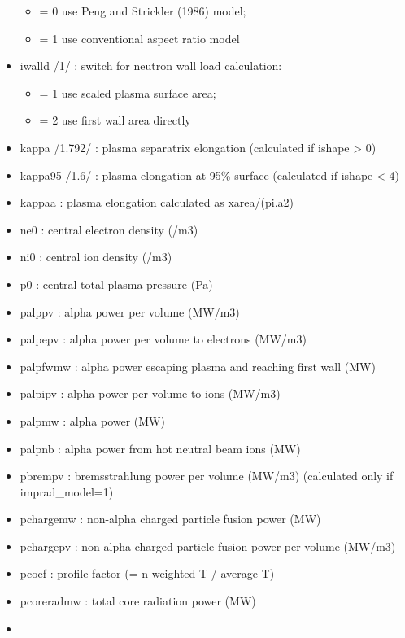 \documentclass[]{article}
\begin{document}
\begin{itemize}
  \begin{itemize}
  \itemsep1pt\parskip0pt
  \item
    = 0 use Peng and Strickler (1986) model;
  \item
    = 1 use conventional aspect ratio model
  \end{itemize}
\item
  iwalld /1/ : switch for neutron wall load calculation:

  \begin{itemize}
  \itemsep1pt\parskip0pt
  \item
    = 1 use scaled plasma surface area;
  \item
    = 2 use first wall area directly
  \end{itemize}
\item
  kappa /1.792/ : plasma separatrix elongation (calculated if ishape
  \textgreater{} 0)
\item
  kappa95 /1.6/ : plasma elongation at 95\% surface (calculated if
  ishape \textless{} 4)
\item
  kappaa : plasma elongation calculated as xarea/(pi.a2)
\item
  ne0 : central electron density (/m3)
\item
  ni0 : central ion density (/m3)
\item
  p0 : central total plasma pressure (Pa)
\item
  palppv : alpha power per volume (MW/m3)
\item
  palpepv : alpha power per volume to electrons (MW/m3)
\item
  palpfwmw : alpha power escaping plasma and reaching first wall (MW)
\item
  palpipv : alpha power per volume to ions (MW/m3)
\item
  palpmw : alpha power (MW)
\item
  palpnb : alpha power from hot neutral beam ions (MW)
\item
  pbrempv : bremsstrahlung power per volume (MW/m3) (calculated only if
  imprad\_model=1)
\item
  pchargemw : non-alpha charged particle fusion power (MW)
\item
  pchargepv : non-alpha charged particle fusion power per volume (MW/m3)
\item
  pcoef : profile factor (= n-weighted T / average T)
\item
  pcoreradmw : total core radiation power (MW)
\item

\end{itemize}
\end{document}
